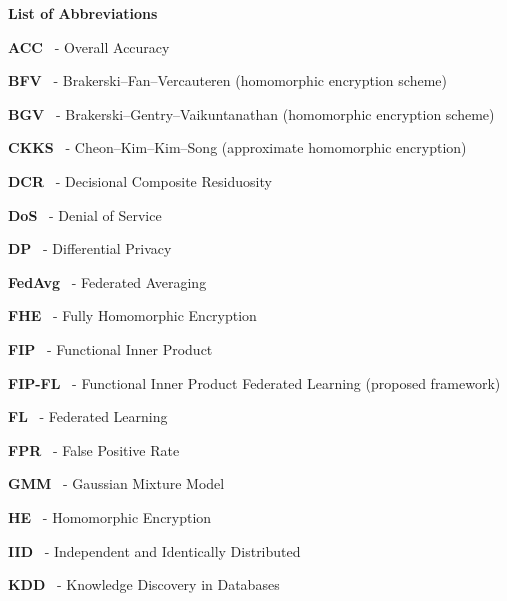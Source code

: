 \documentclass{iitthesis}
\makeatletter
\newcommand{\CompactFrontMatterList}[1]{%
	\begingroup
	\singlespacing
	\setlength{\parskip}{0pt}%
	#1%
	\endgroup
}
\renewcommand{\cleardoublepage}{%
	\clearpage
	\if@twoside
		\ifodd\c@page
		\else
			\hbox{}\thispagestyle{empty}\newpage
			\if@twocolumn\hbox{}\newpage\fi
		\fi
	\fi
}
\makeatother
\begin{document}
	\justifying
	
	
	
	
	\cleardoublepage
	\CompactFrontMatterList{\tableofcontents}
	\cleardoublepage
	\CompactFrontMatterList{\listoffigures}
	\cleardoublepage
	\CompactFrontMatterList{\listoftables}
	\cleardoublepage

	\begingroup
	\singlespacing
	\setlength{\parskip}{0pt}
	\noindent\textbf{\LARGE List of Abbreviations}
	\vspace{0.45cm}
	\small
	\begin{description}
		\setlength{\itemsep}{1pt}
		\setlength{\parsep}{0pt}
		\setlength{\topsep}{0pt}
		\item \textbf{ACC} \, - Overall Accuracy
		\item \textbf{BFV} \, - Brakerski--Fan--Vercauteren (homomorphic encryption scheme)
		\item \textbf{BGV} \, - Brakerski--Gentry--Vaikuntanathan (homomorphic encryption scheme)
		\item \textbf{CKKS} \, - Cheon--Kim--Kim--Song (approximate homomorphic encryption)
		\item \textbf{DCR} \, - Decisional Composite Residuosity
		\item \textbf{DoS} \, - Denial of Service
		\item \textbf{DP} \, - Differential Privacy
		\item \textbf{FedAvg} \, - Federated Averaging
		\item \textbf{FHE} \, - Fully Homomorphic Encryption
		\item \textbf{FIP} \, - Functional Inner Product
		\item \textbf{FIP-FL} \, - Functional Inner Product Federated Learning (proposed framework)
		\item \textbf{FL} \, - Federated Learning
		\item \textbf{FPR} \, - False Positive Rate
		\item \textbf{GMM} \, - Gaussian Mixture Model
		\item \textbf{HE} \, - Homomorphic Encryption
		\item \textbf{IID} \, - Independent and Identically Distributed
		\item \textbf{KDD} \, - Knowledge Discovery in Databases

\end{description}
\end{document}
